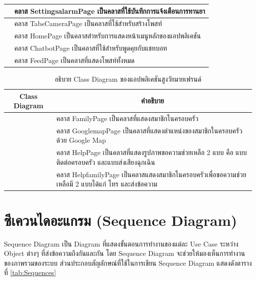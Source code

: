 \begin{table}[H]
\begin{tabular}{|c|p{10cm}|}
			& \setstretch{1.5} {คลาส SettingsalarmPage เป็นคลาสที่ใช้บันทึกการแจ้งเตือนการทานยา} \\ \hline
			\raisebox{-\totalheight}{TabsCameraPage}
			& \setstretch{1.5} {คลาส TabsCameraPage เป็นคลาสที่ใช้สำหรับสร้างโพสท์} \\ \hline
			\raisebox{-\totalheight}{HomePage}
			& \setstretch{1.5} {คลาส HomePage เป็นคลาสสำหรับการแสดงหน้าเมนูหลักของแอปพลิเคชัน} \\ \hline
			\raisebox{-\totalheight}{ChatbotPage}
			& \setstretch{1.5} {คลาส ChatbotPage เป็นคลาสที่ใช้สำหรับพูดคุยกับแชทบอท} \\ \hline
			\raisebox{-\totalheight}{FeedPage}
			& \setstretch{1.5} {คลาส FeedPage เป็นคลาสที่แสดงโพสท์ทั้งหมด} \\ \hline
	\end{tabular}
\end{table}

\begin{table}[H]
	\centering
	\caption{อธิบาย Class Diagram ของแอปพลิเคชันสูงวัยมายเฟรนด์}
	\label{tab:class}
	\begin{tabular}{|c|p{10cm}|}
		\hline
		\textbf{Class Diagram} & \multicolumn{1}{c|}{\textbf{คำอธิบาย}} \\ \hline
		\raisebox{-\totalheight}{FamilyPage}
		& \setstretch{1.5} {คลาส FamilyPage เป็นคลาสที่แสดงสมาชิกในครอบครัว} \\ \hline
		\raisebox{-\totalheight}{GooglemapPage}
		& \setstretch{1.5} {คลาส GooglemapPage เป็นคลาสที่แสดงตำแหน่งของสมาชิกในครอบครัวด้วย Google Map} \\ \hline
		\raisebox{-\totalheight}{HelpPage}
		& \setstretch{1.5} {คลาส HelpPage เป็นคลาสที่แสดงรูปภาพขอความช่วยเหลือ 2 แบบ คือ แบบติดต่อครอบครัว และแบบส่งเสียงฉุกเฉิน} \\ \hline
		\raisebox{-\totalheight}{HelpfamilyPage}
		& \setstretch{1.5} {คลาส HelpfamilyPage เป็นคลาสแสดงสมาชิกในครอบครัวเพื่อขอความช่วยเหลือมี 2 แบบได้แก่ โทร และส่งข้อความ} \\ \hline
\end{tabular}
\end{table}

\newpage



\section{ซีเควนไดอะแกรม (Sequence Diagram)}
	Sequence Diagram เป็น Diagram ที่แสดงขั้นตอนการทำงานของแต่ละ Use Case ระหว่าง Object ต่างๆ ที่ส่งข้อความถึงกันและกัน โดย Sequence Diagram จะช่วยให้มองเห็นการทำงานของภาพรวมของระบบ ส่วนประกอบสัญลักษณ์ที่ใช้ในการเขียน Sequence Diagram 
	แสดงดังตารางที่ \ref{tab:Sequences}
	
